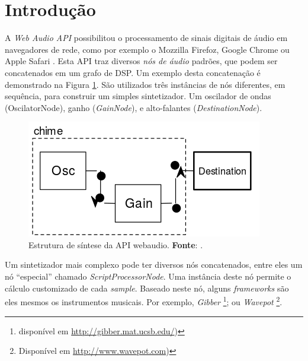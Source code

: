 \section{Introdução}\label{sec:introducao}




A \emph{Web Audio API} \cite{w3c_web_2012} possibilitou o processamento de sinais digitais de áudio em navegadores de rede, como por exemplo o Mozzilla Firefoz, Google Chrome ou Apple Safari \cite{roberts_web_2013,wyse_viability_2014}.  Esta API traz diversos \emph{nós de áudio} padrões, que podem ser concatenados em um grafo de DSP. Um exemplo desta concatenação é demonstrado na Figura \ref{fig:shime}.  São utilizados três instâncias de nós diferentes, em sequência, para construir um simples sintetizador. Um oscilador de ondas (OscilatorNode), ganho (\emph{GainNode}), e alto-falantes (\emph{DestinationNode}).

\begin{figure}[h]
\centering
\includegraphics[scale=0.35]{chime.png}
\caption{Estrutura de síntese da API webaudio. \textbf{Fonte}: \cite{srikumar_tamming_2013}.}
\label{fig:shime}
\end{figure}

Um sintetizador mais complexo pode ter diversos nós concatenados, entre eles um nó ``especial'' chamado \emph{ScriptProcessorNode}. Uma instância deste nó permite o cálculo customizado de cada \emph{sample}. Baseado neste nó, alguns \emph{frameworks} são eles mesmos os instrumentos musicais. Por exemplo, \emph{Gibber} \footnote{disponível em \url{http://gibber.mat.ucsb.edu/})}; ou \emph{Wavepot} \footnote{Disponível em \url{http://www.wavepot.com})}\label{footnote:apps}.

